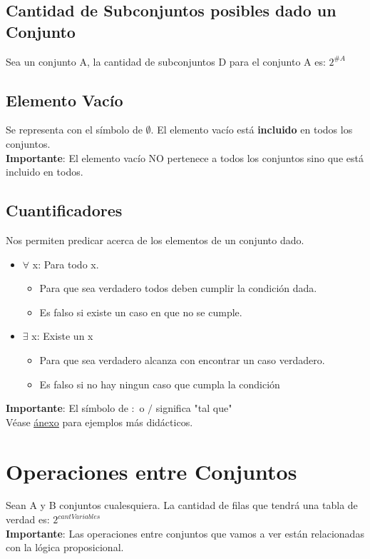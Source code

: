\documentclass[10pt,a4paper]{article}
\begin{document}
\subsection*{Cantidad de Subconjuntos posibles dado un Conjunto}
Sea un conjunto A, la cantidad de subconjuntos D para el conjunto A es: $2^{\#A}$
\subsection*{Elemento Vacío}
Se representa con el símbolo de $\emptyset$. El elemento vacío está \textbf{incluido} en todos los conjuntos. \\
\textbf{Importante}: El elemento vacío NO pertenece a todos los conjuntos sino que está incluido en todos.
\subsection*{Cuantificadores}
Nos permiten predicar acerca de los elementos de un conjunto dado. 
\begin{itemize}
    \item $\forall$ x: Para todo x.
    \begin{itemize}
        \item Para que sea verdadero todos deben cumplir la condición dada.
        \item Es falso si existe un caso en que no se cumple.
    \end{itemize}
    \item $\exists$ x: Existe un x
    \begin{itemize}
        \item Para que sea verdadero alcanza con encontrar un caso verdadero.
        \item Es falso si no hay ningun caso que cumpla la condición
    \end{itemize}
\end{itemize}
\textbf{Importante}: El símbolo de $:$ o $/$ significa "tal que" \\
Véase \hyperref[subsec:cuantificadores]{\underline{ánexo}} para ejemplos más didácticos.
\section*{Operaciones entre Conjuntos}
Sean A y B conjuntos cualesquiera. La cantidad de filas que tendrá una tabla de verdad es: \textbf{$2^{cantVariables}$} \\
\textbf{Importante}: Las operaciones entre conjuntos que vamos a ver están relacionadas con la lógica proposicional.
\end{document}
